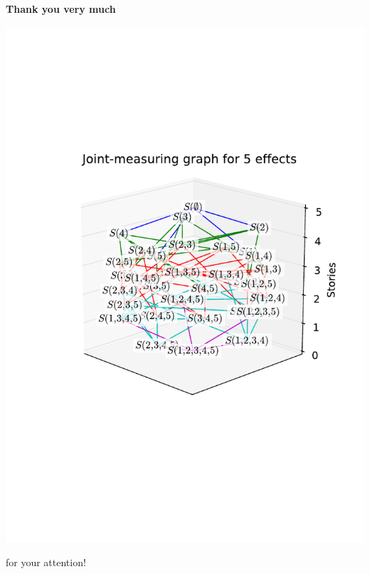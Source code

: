 \documentclass[mathserif,handout]{beamer}
\begin{document}
\begin{frame}

\begin{center}
\bf 
Thank you very much 
\begin{center}
\includegraphics[scale=.6]{images/6.pdf}
\end{center}
for your attention! 
\end{center}
\end{frame}
\end{document}
